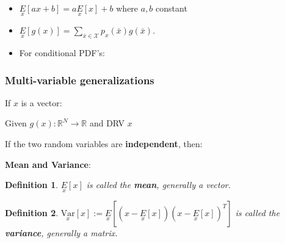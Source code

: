 \documentclass[10pt,a4paper]{scrartcl}
\newtheorem{define}{Definition}
\begin{document}
\begin{multicols*}{2}
{\begin{itemize}
\item $\underset{x}{E}[ax+b]=a\underset{x}{E}[x]+b$ where $a,b$ constant
\item $\underset{x}{E}[g(x)]=\sum\limits_{\bar{x}\in\mathcal{X}}p_x(\bar{x})g(\bar{x})$.
\item For conditional PDF's:
\end{itemize}



\subsubsection{Multi-variable generalizations}

If $x$ is a vector:

\mportant{$\underset{x}{E}[x]=\sum\limits_{\bar{x}\in\mathcal{X}}\bar{x}p_x(\bar{x})=\sum\limits_{\bar{x_1}\in\mathcal{X}}\cdots\sum\limits_{\bar{x}_N\in\mathcal{X}}[\bar{x}_1,\ldots,\bar{x}_N]^Tp_{(x_1,\ldots,x_N)}(\bar{x}_1,\ldots,\bar{x}_N]$}

Given $g(x):\mathbb{R}^N\rightarrow \mathbb{R}$ and DRV $x$


If the two random variables are \textbf{independent}, then:


\textbf{Mean and Variance}:

\begin{define}
$\underset{x}{E}[x]$ is called the \textbf{mean}, generally a vector.
\end{define}

\begin{define}
$\underset{x}{\text{Var}}[x]:=\underset{x}{E}\left[\left(x-\underset{x}{E}[x]\right)\left(x-\underset{x}{E}[x]\right)^T\right]$ is called the \textbf{variance}, generally a matrix.
\end{define}

}
\end{multicols*}
\end{document}
